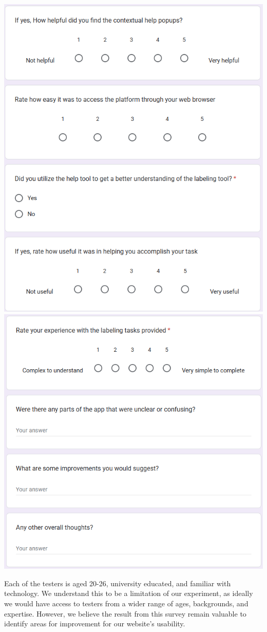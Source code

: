 \documentclass[12pt, titlepage]{article}
\begin{document}
\begin{centering}
\includegraphics[scale=0.7]{Survey (1).png}\\
\includegraphics[scale=0.7]{Survey (2).png}\\
\end{centering}
Each of the testers is aged 20-26, university educated, and familiar with technology. We understand this to be a limitation of our experiment, as ideally we would have access to testers from a wider range of ages, backgrounds, and expertise. However, we believe the result from this 
survey remain valuable to identify areas for improvement for our website's usability.
\end{document}

